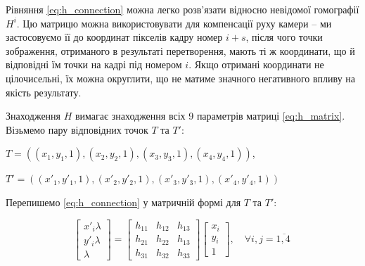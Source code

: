 Рівняння \ref{eq:h_connection} можна легко розв'язати відносно невідомої гомографії
\(H^{i}\). Цю матрицю можна використовувати для компенсації руху камери
-- ми застосовуємо її до координат пікселів кадру номер \(i + s\), після
чого точки зображення, отриманого в результаті перетворення, мають ті ж
координати, що й відповідні їм точки на кадрі під номером \(i\). Якщо
отримані координати не цілочисельні, їх можна округлити, що не матиме
значного негативного впливу на якість результату.

Знаходження $H$ вимагає знаходження всіх 9 параметрів матриці \ref{eq:h_matrix}.
Візьмемо пару відповідних точок $T$ та $T'$:


$T = ((x_1,y_1,1), (x_2,y_2,1), (x_3,y_3,1), (x_4,y_4,1))$,


$T' = ((x'_1,y'_1,1), (x'_2,y'_2,1), (x'_3,y'_3,1), (x'_4,y'_4,1))$

Перепишемо \ref{eq:h_connection} у матричній формі для $T$ та $T'$:

\begin{equation}
    \begin{bmatrix}
        x'_i\lambda \\
        y'_i\lambda \\
        \lambda
    \end{bmatrix}
    =
    \begin{bmatrix}
        h_{11} & h_{12} & h_{13} \\
        h_{21} & h_{22} & h_{13} \\
        h_{31} & h_{32} & h_{33}
    \end{bmatrix}
    \begin{bmatrix}
        x_i \\
        y_i \\
        1
    \end{bmatrix}
    ,\quad\forall i,j = \overline{1,4\ }
    \label{eq:h_connection2}
\end{equation}

